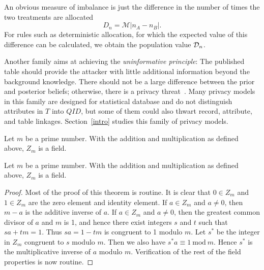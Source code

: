 An obvious measure of imbalance is just the difference in the
number of times the two treatments are allocated
\begin{equation}
D_n = \mathcal{M}|n_A - n_B|. \label{2deffD}
\end{equation}
For rules such as deterministic allocation, for which the expected
value of this difference can be calculated, we obtain the population
value ${\cal D}_n$.

\begin{shortbox}
Another family aims at achieving the \emph{uninformative principle}: The published table should provide the attacker with little additional information beyond the background knowledge. There should not be a large difference between the prior and posterior beliefs; otherwise, there is a privacy threat~\cite{jain2004ass, jolliffe2002pca}. Many privacy models in this family are designed for statistical database and do not distinguish attributes in $T$ into $QID$, but some of them could also thwart record, attribute, and table linkages. Section~\ref{intro} studies this family of privacy models.

Let $m$ be a prime number. With the addition and multiplication as 
defined above, $Z_m$ is a field.
\end{shortbox}

\begin{theorem}\label{1th:Z_m}
Let $m$ be a prime number. With the addition and multiplication as 
defined above, $Z_m$ is a field.
\end{theorem}

\begin{proof}
Most of the proof of this theorem is routine.  It is clear that $0\in Z_m$ 
and $1\in Z_m$ are the 
zero element and identity element. If $a\in Z_m$ and $a\ne 0$, then $m-a$ 
is the additive inverse of $a$. If $a\in Z_m$ and $a\ne 0$, then the 
greatest common divisor of $a$ and $m$ is 1, and hence
there exist integers $s$ and $t$ such that $sa+tm=1$. Thus $sa=1 -tm$ is 
congruent to 1 modulo $m$. Let $s^*$ be the integer in $Z_m$ 
congruent to $s$ 
modulo $m$. Then we also have $s^*a\equiv 1\  \mbox{mod}\ m$. Hence $s^*$ 
is 
the multiplicative inverse of $a$ modulo $m$. Verification of the rest of 
the field properties is now routine.\end{proof}



